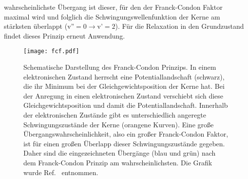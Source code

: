 wahrscheinlichste Übergang ist dieser, für den der Franck-Condon Faktor maximal wird und folglich die
Schwingungswellenfunktion der Kerne am stärksten überlappt ($\text{v''}=0 \rightarrow \text{v'}=2$).
Für die Relaxation in den Grundzustand findet dieses Prinzip erneut Anwendung.
\begin{figure}[h!]
    \centering
    \texttt{[image: fcf.pdf]}
    \caption{\label{fig:fcf}Schematische Darstellung des Franck-Condon Prinzips. In einem elektronischen Zustand
        herrscht eine Potentiallandschaft (schwarz), die ihr Minimum bei der Gleichgewichtsposition der Kerne hat.
        Bei der Anregung in einen elektronischen Zustand verschiebt sich diese Gleichgewichtsposition und damit die
        Potentiallandschaft. Innerhalb der elektronischen Zustände gibt es unterschiedlich angeregte Schwingungszustände
        der Kerne (orangene Kurven). Eine große Übergangswahrscheinlichkeit, also ein großer Franck-Condon Faktor, ist für
        einen großen Überlapp dieser Schwingungszustände gegeben. Daher sind die eingezeichneten Übergänge (blau und grün)
        nach dem Franck-Condon Prinzip am wahrscheinlichsten. Die Grafik wurde Ref.~\cite{fcf} entnommen.}
\end{figure}\\ \FloatBarrier